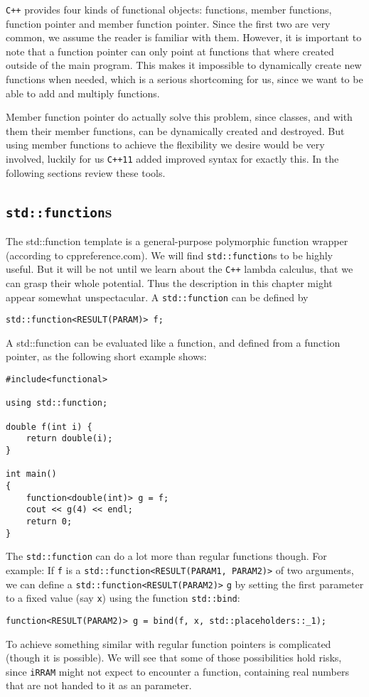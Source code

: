 \documentclass{article}
\newcommand{\irram}{\texttt{iRRAM}\xspace}
\newcommand{\cc}{\texttt{C++}\xspace}
\newcommand{\ccOx}{\texttt{C++11}\xspace}
\newcommand{\code}[1]{\texttt{#1}}
\begin{document}
\cc provides four kinds of functional objects: functions, member functions, function pointer and member function pointer. Since the first two are very common, we assume the reader is familiar with them. However, it is important to note that a function pointer can only point at functions that where created outside of the main program. This makes it impossible to dynamically create new functions when needed, which is a serious shortcoming for us, since we want to be able to add and multiply functions.

Member function pointer do actually solve this problem, since classes, and with them their member functions, can be dynamically created and destroyed. But using member functions to achieve the flexibility we desire would be very involved, luckily for us \ccOx added improved syntax for exactly this. In the following sections review these tools.

\subsection{\code{std::function}s}\label{sec: std::functions}

The std::function template is a general-purpose polymorphic function wrapper (according to cppreference.com). We will find \code{std::function}s to be highly useful. But it will be not until we learn about the \cc lambda calculus, that we can grasp their whole potential. Thus the description in this chapter might appear somewhat unspectacular. A \code{std::function} can be defined by
\begin{lstlisting}
std::function<RESULT(PARAM)> f;
\end{lstlisting}

A std::function can be evaluated like a function, and defined from a function pointer, as the following short example shows:
\begin{lstlisting}
#include<functional>

using std::function;

double f(int i) {
	return double(i);
}

int main()
{
	function<double(int)> g = f;
	cout << g(4) << endl;
	return 0;
}
\end{lstlisting}

The \code{std::function} can do a lot more than regular functions though. For example: If \code{f} is a \code{std::function<RESULT(PARAM1, PARAM2)>} of two arguments, we can define a \code{std::function<RESULT(PARAM2)>} \code{g} by setting the first parameter to a fixed value (say \code x) using the function \code{std::bind}:
\begin{lstlisting}
function<RESULT(PARAM2)> g = bind(f, x, std::placeholders::_1);
\end{lstlisting}
To achieve something similar with regular function pointers is complicated (though it is possible). We will see that some of those possibilities hold risks, since \irram might not expect to encounter a function, containing real numbers that are not handed to it as an parameter.
\end{document}
